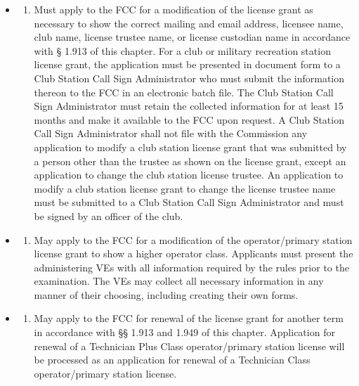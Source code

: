 \documentclass[
  letterpaper,
  DIV=11,
  numbers=noendperiod]{scrreport}
\providecommand{\tightlist}{%
  \setlength{\itemsep}{0pt}\setlength{\parskip}{0pt}}\usepackage{longtable,booktabs,array}
\begin{document}
\begin{itemize}
\item
  \begin{enumerate}
  \def\labelenumi{(\arabic{enumi})}
  \tightlist
  \item
    Must apply to the FCC for a modification of the license grant as
    necessary to show the correct mailing and email address, licensee
    name, club name, license trustee name, or license custodian name in
    accordance with § 1.913 of this chapter. For a club or military
    recreation station license grant, the application must be presented
    in document form to a Club Station Call Sign Administrator who must
    submit the information thereon to the FCC in an electronic batch
    file. The Club Station Call Sign Administrator must retain the
    collected information for at least 15 months and make it available
    to the FCC upon request. A Club Station Call Sign Administrator
    shall not file with the Commission any application to modify a club
    station license grant that was submitted by a person other than the
    trustee as shown on the license grant, except an application to
    change the club station license trustee. An application to modify a
    club station license grant to change the license trustee name must
    be submitted to a Club Station Call Sign Administrator and must be
    signed by an officer of the club.
  \end{enumerate}
\item
  \begin{enumerate}
  \def\labelenumi{(\arabic{enumi})}
  \setcounter{enumi}{1}
  \tightlist
  \item
    May apply to the FCC for a modification of the operator/primary
    station license grant to show a higher operator class. Applicants
    must present the administering VEs with all information required by
    the rules prior to the examination. The VEs may collect all
    necessary information in any manner of their choosing, including
    creating their own forms.
  \end{enumerate}
\item
  \begin{enumerate}
  \def\labelenumi{(\arabic{enumi})}
  \setcounter{enumi}{2}
  \tightlist
  \item
    May apply to the FCC for renewal of the license grant for another
    term in accordance with §§ 1.913 and 1.949 of this chapter.
    Application for renewal of a Technician Plus Class operator/primary
    station license will be processed as an application for renewal of a
    Technician Class operator/primary station license.
  \end{enumerate}


\end{itemize}
\end{document}
